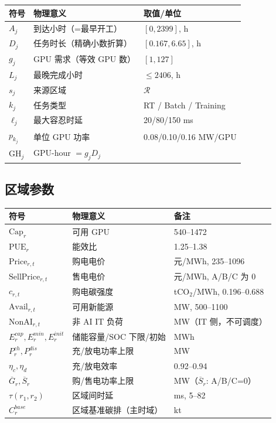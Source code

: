\documentclass{internal-report}
\begin{document}
\begin{center}
\footnotesize
\begin{tabular}{lll}
\toprule
符号 & 物理意义 & 取值/单位 \\
\midrule
$A_j$ & 到达小时（=最早开工） & $[0,2399]$, h \\
$D_j$ & 任务时长（精确小数折算） & $[0.167,6.65]$, h \\
$g_j$ & GPU 需求（等效 GPU 数） & $[1,127]$ \\
$L_j$ & 最晚完成小时 & $\le 2406$, h \\
$s_j$ & 来源区域 & $\mathcal{R}$ \\
$k_j$ & 任务类型 & RT / Batch / Training \\
$\ell_j$ & 最大容忍时延 & 20/80/150 ms \\
$p_{k_j}$ & 单位 GPU 功率 & 0.08/0.10/0.16 MW/GPU \\
$\text{GH}_j$ & GPU-hour $= g_j D_j$ & \\
\bottomrule
\end{tabular}
\end{center}

\subsection{区域参数}

\begin{center}
\footnotesize
\begin{tabular}{lll}
\toprule
符号 & 物理意义 & 备注 \\
\midrule
$\text{Cap}_r$ & 可用 GPU & 540--1472 \\
$\text{PUE}_r$ & 能效比 & 1.25--1.38 \\
$\text{Price}_{r,t}$ & 购电电价 & 元/MWh, 235--1096 \\
$\text{SellPrice}_{r,t}$ & 售电电价 & 元/MWh, A/B/C 为 0 \\
$c_{r,t}$ & 购电碳强度 & tCO$_2$/MWh, 0.196--0.688 \\
$\text{Avail}_{r,t}$ & 可用新能源 & MW, 500--1100 \\
$\text{NonAI}_{r,t}$ & 非 AI IT 负荷 & MW（IT 侧，不可调度） \\
$E^{cap}_r,E^{min}_r,E^{init}_r$ & 储能容量/SOC 下限/初始 & MWh \\
$P^{ch}_r,P^{dis}_r$ & 充/放电功率上限 & MW \\
$\eta_c,\eta_d$ & 充/放电效率 & 0.92--0.94 \\
$\overline{G}_r,\overline{S}_r$ & 购/售电功率上限 & MW（$\overline{S}_r$: A/B/C=0） \\
$\tau(r_1,r_2)$ & 区域间时延 & ms, 5--82 \\
$C^{base}_r$ & 区域基准碳排（主时域） & kt \\
\bottomrule
\end{tabular}
\end{center}
\end{document}
